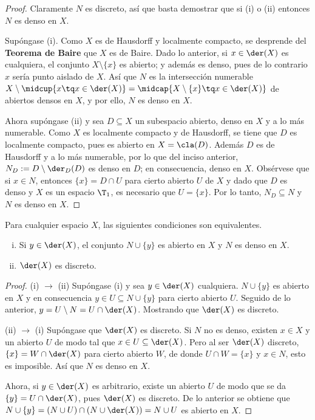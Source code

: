	\begin{proof} 
		Claramente $N$ es discreto, así que basta demostrar que si (i) o (ii) entonces $N$ es denso en $X$.
	
		Supóngase (i). Como $X$ es de Hausdorff y localmente compacto, se desprende del \textbf{Teorema de Baire} que $X$ es de Baire. Dado lo anterior, si $x \in \der(X)$ es cualquiera, el conjunto $X \setminus \{x\}$ es abierto; y además es denso, pues de lo contrario $x$ sería punto aislado de $X$. Así que $N$ es la intersección numerable $X \setminus \midcup\{x \tq x \in \der(X) \} = \midcap\{ X \setminus \{x\} \tq x \in \der(X)\}$ de abiertos densos en $X$, y por ello, $N$ es denso en $X$.
		
		Ahora supóngase (ii) y sea $D \subseteq X$ un subespacio abierto, denso en $X$ y a lo más numerable. Como $X$ es localmente compacto y de Hausdorff, se tiene que $D$ es localmente compacto, pues es abierto en $X=\cla(D)$. Además $D$ es de Hausdorff y a lo más numerable, por lo que del inciso anterior, $N_D:=D \setminus \der_D(D)$ es denso en $D$; en consecuencia, denso en $X$. Obsérvese que si $x \in N$, entonces $\{x\}=D \cap U$ para cierto abierto $U$ de $X$ y dado que $D$ es denso y $X$ es un espacio $\T_1$, es necesario que $U=\{x\}$. Por lo tanto, $N_D \subseteq N$ y $N$ es denso en $X$.
	\end{proof}
	
	\begin{lema}\label{lem-TKR-DerX}
		Para cualquier espacio $X$, las siguientes condiciones son equivalentes.
		\begin{enumerate}[i)]
			\item Si $y \in \der(X)$, el conjunto $N \cup \{y\}$ es abierto en $X$ y $N$ es denso en $X$.
			\item $\der(X)$ es discreto.
		\end{enumerate}
	\end{lema}
	
	\begin{proof} 
		(i) $\rightarrow$ (ii) Supóngase (i) y sea $y \in \der(X)$ cualquiera. $N \cup \{y\}$ es abierto en $X$ y en consecuencia $y \in U \subseteq N \cup \{y\}$ para cierto abierto $U$. Seguido de lo anterior, $y = U \setminus N = U \cap \der(X)$. Mostrando que $\der(X)$ es discreto.
		
		(ii) $\rightarrow$ (i) Supóngase que $\der(X)$ es discreto. Si $N$ no es denso, existen $x \in X$ y un abierto $U$ de modo tal que $x \in U \subseteq \der(X)$. Pero al ser $\der(X)$ discreto, $\{x\}=W \cap \der(X)$ para cierto abierto $W$, de donde $U \cap W = \{x\}$ y $x \in N$, esto es imposible. Así que $N$ es denso en $X$.
		
		Ahora, si $y \in \der(X)$ es arbitrario, existe un abierto $U$ de modo que se da $\{y\} = U \cap \der(X)$, pues $\der(X)$ es discreto. De lo anterior se obtiene que $N \cup \{y\} = (N \cup U) \cap (N \cup \der(X)) = N \cup U$ es abierto en $X$.
	\end{proof}
			
